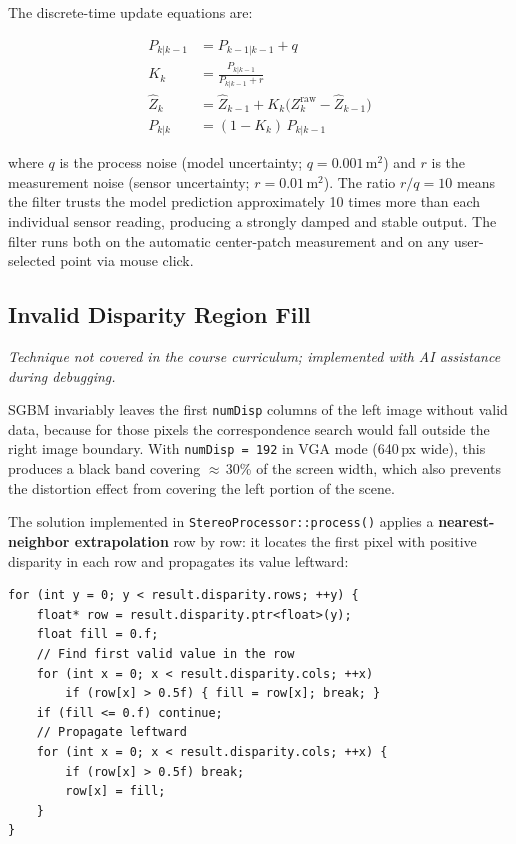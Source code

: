 \documentclass[12pt, a4paper]{article}
\begin{document}
The discrete-time update equations are:

\begin{align}
  P_{k|k-1}   &= P_{k-1|k-1} + q  \tag{Prediction: covariance} \\
  K_k         &= \frac{P_{k|k-1}}{P_{k|k-1} + r}  \tag{Kalman gain} \\
  \hat{Z}_k   &= \hat{Z}_{k-1} + K_k \bigl(Z^{\text{raw}}_k - \hat{Z}_{k-1}\bigr)  \tag{Update: estimate} \\
  P_{k|k}     &= (1 - K_k)\, P_{k|k-1}  \tag{Update: covariance}
\end{align}

where $q$ is the process noise (model uncertainty; $q = 0.001$\,m$^2$) and
$r$ is the measurement noise (sensor uncertainty; $r = 0.01$\,m$^2$).
The ratio $r/q = 10$ means the filter trusts the model prediction approximately
10 times more than each individual sensor reading, producing a strongly damped and
stable output. The filter runs both on the automatic center-patch measurement and on
any user-selected point via mouse click.

\subsection{Invalid Disparity Region Fill}
\label{sec:disparityfill}

\emph{Technique not covered in the course curriculum; implemented with AI assistance
during debugging.}

SGBM invariably leaves the first \texttt{numDisp} columns of the left image without
valid data, because for those pixels the correspondence search would fall outside the
right image boundary. With \texttt{numDisp\,=\,192} in VGA mode (640\,px wide), this
produces a black band covering $\approx$\,30\% of the screen width, which also
prevents the distortion effect from covering the left portion of the scene.

The solution implemented in \texttt{StereoProcessor::process()} applies a
\textbf{nearest-neighbor extrapolation} row by row: it locates the first pixel with
positive disparity in each row and propagates its value leftward:

\begin{lstlisting}[style=cppstyle, caption={Invalid-region fill in StereoProcessor.cpp.}]
for (int y = 0; y < result.disparity.rows; ++y) {
    float* row = result.disparity.ptr<float>(y);
    float fill = 0.f;
    // Find first valid value in the row
    for (int x = 0; x < result.disparity.cols; ++x)
        if (row[x] > 0.5f) { fill = row[x]; break; }
    if (fill <= 0.f) continue;
    // Propagate leftward
    for (int x = 0; x < result.disparity.cols; ++x) {
        if (row[x] > 0.5f) break;
        row[x] = fill;
    }
}
\end{lstlisting}
\end{document}
